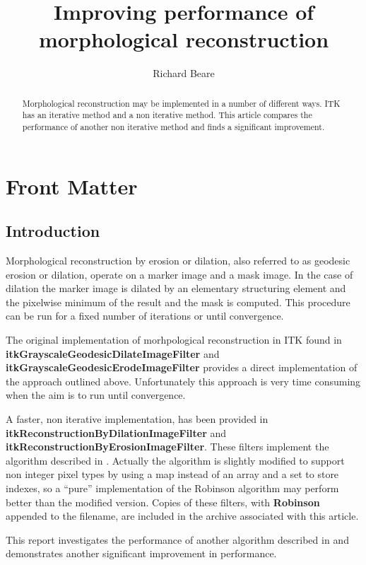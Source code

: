\documentclass{InsightArticle}
\title{Improving performance of morphological reconstruction}
\author{Richard Beare}
\begin{document}
\maketitle

\ifhtml
\chapter*{Front Matter\label{front}}
\fi


\begin{abstract}
\noindent
Morphological reconstruction may be implemented in a number of
different ways. ITK has an iterative method and a non iterative
method. This article compares the performance of another non iterative
method and finds a significant improvement.
\end{abstract}

\tableofcontents

\section{Introduction}
Morphological reconstruction by erosion or dilation, also referred to
as geodesic erosion or dilation, operate on a marker image and a mask
image. In the case of dilation the marker image is dilated by an
elementary structuring element and the pixelwise minimum of the result
and the mask is computed. This procedure can be run for a fixed number
of iterations or until convergence.

The original implementation of morhpological reconstruction in ITK
found in {\bf itkGrayscaleGeodesicDilateImageFilter} and {\bf
itkGrayscaleGeodesicErodeImageFilter} provides a direct implementation
of the approach outlined above. Unfortunately this approach is very
time consuming when the aim is to run until convergence.

A faster, non iterative implementation, has been provided in {\bf
itkReconstructionByDilationImageFilter} and {\bf
itkReconstructionByErosionImageFilter}. These filters implement the
algorithm described in \cite{Robinson2004a}. Actually the algorithm is
slightly modified to support non integer pixel types by using a map
instead of an array and a set to store indexes, so a ``pure''
implementation of the Robinson algorithm may perform better than the
modified version. Copies of these filters, with {\bf Robinson}
appended to the filename, are included in the archive associated with
this article.

This report investigates the performance of another algorithm
described in \cite{Vincent93a} and demonstrates another significant
improvement in performance.
\end{document}
